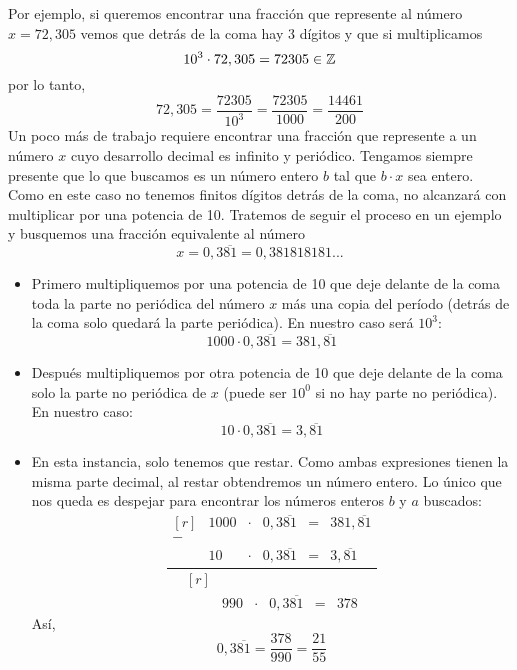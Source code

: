 \documentclass[../teoria.root.tex]{subfiles}
\begin{document}
Por ejemplo, si queremos encontrar una fracción que represente al número \(x = 72,305\) vemos que detrás de la coma hay 3 dígitos y que si multiplicamos
\[10^3\cdot72,305=72305\in\mathbb{Z}\] por lo tanto, \[72,305=\frac{72305}{10^3}=\frac{72305}{1000}=\frac{14461}{200}\]
Un poco más de trabajo requiere encontrar una fracción que represente a un número \(x\) cuyo desarrollo decimal es infinito y periódico.
Tengamos siempre presente que lo que buscamos es un número entero \(b\) tal que \(b \cdot x\) sea entero.
Como en este caso no tenemos finitos dígitos detrás de la coma, no alcanzará con multiplicar por una potencia de 10.
Tratemos de seguir el proceso en un ejemplo y busquemos una fracción equivalente al número \[x=0,3\overline{81}=0,381818181...\]
\begin{itemize}
    \item Primero multipliquemos por una potencia de 10 que deje delante de la coma toda la parte no periódica del número \(x\) más una copia del período (detrás de la coma solo quedará la parte periódica).
          En nuestro caso será \(10^3\):\[1000\cdot0,3\overline{81}=381,\overline{81}\]
    \item Después multipliquemos por otra potencia de 10 que deje delante de la coma solo la parte no periódica de \(x\) (puede ser \(10^0\) si no hay parte no periódica).
          En nuestro caso:\[10\cdot0,3\overline{81}=3,\overline{81}\]
    \item En esta instancia, solo tenemos que restar.
          Como ambas expresiones tienen la misma parte decimal, al restar obtendremos un número entero.
          Lo único que nos queda es despejar para encontrar los números enteros \(b\) y \(a\) buscados:
          {
          \def\arraystretch{1}
          \[\frac{
                  \begin{matrix*}[r]
                      & 1000 & \cdot & 0,3\overline{81} & = & 381,\overline{81}\\
                      -\\
                      & 10 & \cdot & 0,3\overline{81} & = & 3,\overline{81}
                  \end{matrix*}
              }{
                  \begin{matrix*}[r]
                      \\
                      & 990 & \cdot & 0,3\overline{81} & = & 378
                  \end{matrix*}
              }\]
          }
          Así, \[0,3\overline{81}=\frac{378}{990}=\frac{21}{55}\]
\end{itemize}
\end{document}

